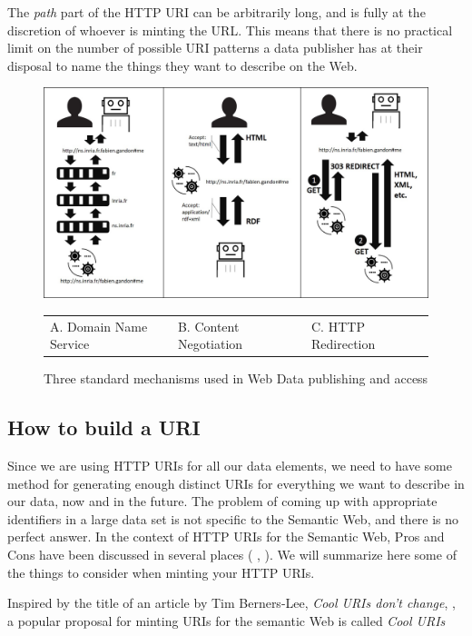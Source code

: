 The \emph{path} part of the HTTP URI can be arbitrarily long, and is fully at the discretion of
whoever is minting the URL.  This means that there is 
no practical limit on the number of possible URI patterns a data publisher has  at their disposal to name the things they
want to describe on the Web. 

\begin{figure}
    \centering
        \includegraphics[width=5.0in]{media/ch5/figure-05-02.jpg}
        \begin{tabular}{lll}
        A. Domain Name Service\ \ \ \ \ \ &B. Content Negotiation\ \ \ \ \ &C. HTTP Redirection\ \ \ \  \\
        \end{tabular}
    \caption{Three standard mechanisms used in Web Data publishing and
access}
    \label{fig:ch5.2}
\end{figure}

\subsection{How to build a URI}

Since we are using HTTP URIs for all our data elements, we need to have some 
method for generating enough distinct URIs for everything we want to describe in our data, now and in the future.
The problem of coming up with appropriate identifiers in a large data set is not 
specific to the Semantic Web, and there is no perfect answer. In the context of HTTP URIs for the Semantic Web,
Pros
and Cons have been discussed in several places (
  \cite{Cooluris},
  \cite{URIDoc}).  We will
summarize here some of the things to consider when minting your HTTP
URIs. 


Inspired by the title of an article by Tim Berners-Lee, \emph{Cool URIs don't change}, \cite{dontchange}, a popular proposal for 
minting URIs for the semantic Web is called \emph{Cool URIs}

